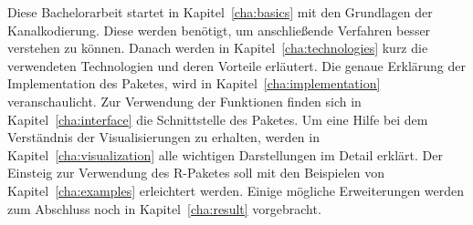 Diese Bachelorarbeit startet in Kapitel~\ref{cha:basics} mit den Grundlagen der Kanalkodierung. Diese werden benötigt, um anschließende Verfahren besser verstehen zu können. Danach werden in Kapitel~\ref{cha:technologies} kurz die verwendeten Technologien und deren Vorteile erläutert. Die genaue Erklärung der Implementation des Paketes, wird in Kapitel~\ref{cha:implementation} veranschaulicht. Zur Verwendung der Funktionen finden sich in Kapitel~\ref{cha:interface} die Schnittstelle des Paketes. Um eine Hilfe bei dem Verständnis der Visualisierungen zu erhalten, werden in Kapitel~\ref{cha:visualization} alle wichtigen Darstellungen im Detail erklärt. Der Einsteig zur Verwendung des R-Paketes soll mit den Beispielen von Kapitel~\ref{cha:examples} erleichtert werden. Einige mögliche Erweiterungen werden zum Abschluss noch in Kapitel~\ref{cha:result} vorgebracht.